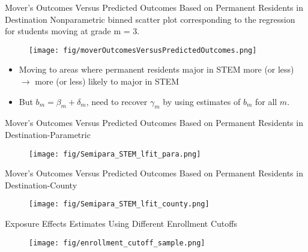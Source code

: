 \documentclass[aspectratio=169,xcolor=dvipsnames]{beamer}
\begin{document}
\begin{frame}{\normal Mover's Outcomes Versus Predicted Outcomes Based on Permanent Residents in Destination}\label{symmetry}
Nonparametric binned scatter plot corresponding to the regression for students moving at grade m = 3. 
\vspace{-0.2cm}
\begin{figure}[H]
    \centering
    		\texttt{[image: fig/moverOutcomesVersusPredictedOutcomes.png]}
    \end{figure}
\begin{itemize}
    \item Moving to areas where permanent residents major in STEM more (or less) $\rightarrow$ more (or less) likely to major in STEM
    \item But $b_m = \beta_m + \delta_m$, need to recover $\gamma_m$ by using estimates of $b_m$ for all $m$. 
    \hyperlink{semi-para}{} 
\end{itemize}
\end{frame}


\begin{frame}{\normal Mover's Outcomes Versus Predicted Outcomes Based on Permanent Residents in Destination-Parametric}\label{para}
\begin{figure}[H]
    \centering
        \centering
    		\texttt{[image: fig/Semipara\_STEM\_lfit\_para.png]}
	\par\smallskip
    \end{figure}
 \hyperlink{semi-para}{}
\end{frame}

\begin{frame}{\normal Mover's Outcomes Versus Predicted Outcomes Based on Permanent Residents in Destination-County}\label{county}

\begin{figure}[H]
    \centering
        \centering
    		\texttt{[image: fig/Semipara\_STEM\_lfit\_county.png]}
	\par\smallskip
    \end{figure}
 \hyperlink{semi-para}{}
\end{frame}

\begin{frame}{Exposure Effects Estimates Using Different Enrollment Cutoffs}\label{enrol_cutoff}

\begin{figure}[H]
    \centering
        \centering
    		\texttt{[image: fig/enrollment\_cutoff\_sample.png]}
	\par\smallskip
    \end{figure}
 \hyperlink{tab_main}{} 
\end{frame}
\end{document}
